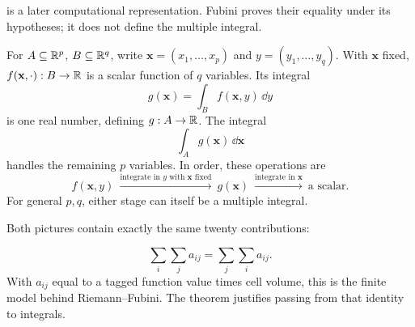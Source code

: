 is a later computational representation. Fubini proves their equality
under its hypotheses; it does not define the multiple integral.

For $A\subseteq\mathbb{R}^p$, $B\subseteq\mathbb{R}^q$, write
$\mathbf{x}=(x_1,\ldots,x_p)$ and $y=(y_1,\ldots,y_q)$. With $\mathbf{x}$ fixed,
$f(\mathbf{x},\cdot):B\to\mathbb{R}$ is a scalar function of $q$ variables.
Its integral
\[
g(\mathbf{x})=\int_B f(\mathbf{x},y)\,\dd y
\]
 is one real number, defining
$g:A\to\mathbb{R}$. The integral
\[
\int_A g(\mathbf{x})\,\dd\mathbf{x}
\]
 handles the remaining
$p$ variables. In order, these operations are
\[
f(\mathbf{x},y)\ \xrightarrow{\text{integrate in }y\text{ with }\mathbf{x}\text{ fixed}}\
g(\mathbf{x})\ \xrightarrow{\text{integrate in }\mathbf{x}}\ \text{a scalar}.
\]
For general $p,q$, either stage can itself be a multiple integral.


\begin{center}
\end{center}
Both pictures contain exactly the same twenty contributions:

\[
\sum_i\sum_j a_{ij}=\sum_j\sum_i a_{ij}.
\]
 With $a_{ij}$ equal to a
tagged function value times cell volume, this is the finite model behind
Riemann--Fubini. The theorem justifies passing from that identity to integrals.

